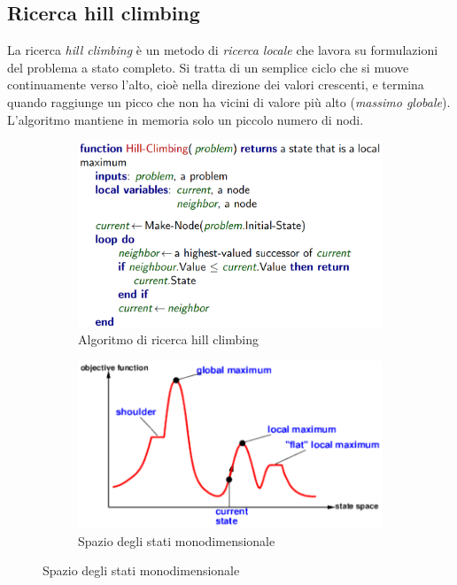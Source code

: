 \documentclass[11pt,oneside]{book}
\begin{document}
\subsection{Ricerca hill climbing}
La ricerca \textit{hill climbing} è un metodo di \textit{ricerca locale} che lavora su formulazioni del problema a stato completo. Si tratta di un semplice ciclo che si muove continuamente verso l'alto, cioè nella direzione dei valori crescenti, e termina quando raggiunge un picco che non ha vicini di valore più alto (\textit{massimo globale}). L'algoritmo mantiene in memoria solo un piccolo numero di nodi.
\begin{figure}[htp]
	\begin{subfigure}{0.49\textwidth}
	    \centering
		\includegraphics[width=\textwidth, height=\textheight, keepaspectratio]{hill-climbing-1.png} 
		\caption{Algoritmo di ricerca hill climbing}
	\end{subfigure}
	\hfill
	\begin{subfigure}{0.49\textwidth}
	    \centering
		\includegraphics[width=\textwidth, height=\textheight, keepaspectratio]{hill-climbing-2.png} 
		\caption{Spazio degli stati monodimensionale}
	\end{subfigure}
\end{figure}
\end{document}
